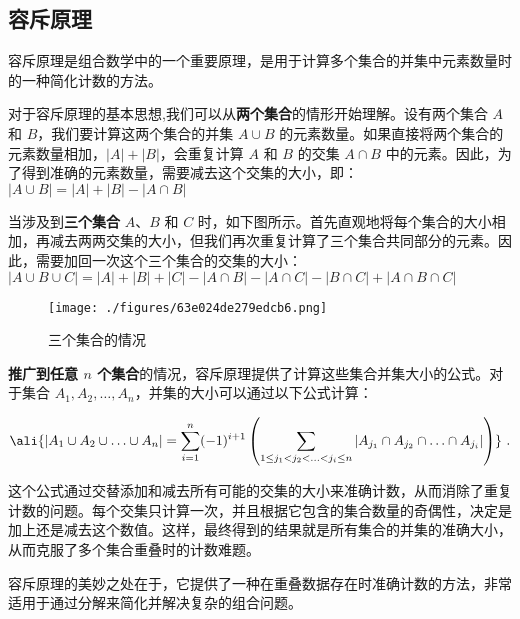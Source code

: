 
\subsection{容斥原理}

容斥原理是组合数学中的一个重要原理，是用于计算多个集合的并集中元素数量时的一种简化计数的方法。

对于容斥原理的基本思想,我们可以从\textbf{两个集合}的情形开始理解。设有两个集合 \(A\) 和 \(B\)，我们要计算这两个集合的并集 \(A \cup B\) 的元素数量。如果直接将两个集合的元素数量相加，\( |A| + |B| \)，会重复计算 \(A\) 和 \(B\) 的交集 \(A \cap B\) 中的元素。因此，为了得到准确的元素数量，需要减去这个交集的大小，即：
$|A \cup B| = |A| + |B| - |A \cap B|$

当涉及到\textbf{三个集合} \(A\)、\(B\) 和 \(C\) 时，如下图所示。首先直观地将每个集合的大小相加，再减去两两交集的大小，但我们再次重复计算了三个集合共同部分的元素。因此，需要加回一次这个三个集合的交集的大小：
$|A \cup B \cup C| = |A| + |B| + |C| - |A \cap B| - |A \cap C| - |B \cap C| + |A \cap B \cap C|$

\begin{figure}[ht]
\centering
\texttt{[image: ./figures/63e024de279edcb6.png]}
\caption{三个集合的情况} \label{fig_inex_1}
\end{figure}


\textbf{推广到任意 \(n\) 个集合}的情况，容斥原理提供了计算这些集合并集大小的公式。对于集合 \(A_1, A_2, \ldots, A_n\)，并集的大小可以通过以下公式计算：



\begin{equation}\label{eq_inex_1}
\ali{    
|A_1 \cup A_2 \cup \ldots \cup A_n| = \sum_{i=1}^{n} (-1)^{i+1} \left( \sum_{1 \leq j_1 < j_2 < \ldots < j_i \leq n} |A_{j_1} \cap A_{j_2} \cap \ldots \cap A_{j_i}| \right)
}~.
\end{equation}


这个公式通过交替添加和减去所有可能的交集的大小来准确计数，从而消除了重复计数的问题。每个交集只计算一次，并且根据它包含的集合数量的奇偶性，决定是加上还是减去这个数值。这样，最终得到的结果就是所有集合的并集的准确大小，从而克服了多个集合重叠时的计数难题。

容斥原理的美妙之处在于，它提供了一种在重叠数据存在时准确计数的方法，非常适用于通过分解来简化并解决复杂的组合问题。
